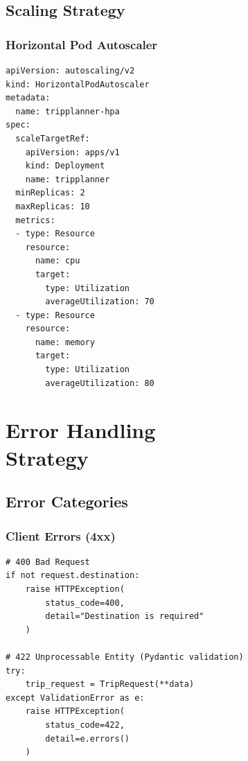 \documentclass[12pt,a4paper]{report}
\begin{document}
\begin{figure}[H]
\begin{plantuml}
\begin{figure}[H]
\begin{plantuml}
\section{Scaling Strategy}

\subsection{Horizontal Pod Autoscaler}

\begin{lstlisting}[style=yamlStyle, caption={HPA Configuration}]
apiVersion: autoscaling/v2
kind: HorizontalPodAutoscaler
metadata:
  name: tripplanner-hpa
spec:
  scaleTargetRef:
    apiVersion: apps/v1
    kind: Deployment
    name: tripplanner
  minReplicas: 2
  maxReplicas: 10
  metrics:
  - type: Resource
    resource:
      name: cpu
      target:
        type: Utilization
        averageUtilization: 70
  - type: Resource
    resource:
      name: memory
      target:
        type: Utilization
        averageUtilization: 80
\end{lstlisting}


\chapter{Error Handling Strategy}

\section{Error Categories}

\subsection{Client Errors (4xx)}

\begin{lstlisting}[style=pythonstyle, caption={Client Error Handling}]
# 400 Bad Request
if not request.destination:
    raise HTTPException(
        status_code=400,
        detail="Destination is required"
    )

# 422 Unprocessable Entity (Pydantic validation)
try:
    trip_request = TripRequest(**data)
except ValidationError as e:
    raise HTTPException(
        status_code=422,
        detail=e.errors()
    )


\end{lstlisting}
\end{plantuml}
\end{figure}
\end{plantuml}
\end{figure}
\end{document}
